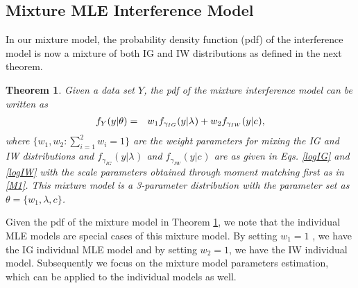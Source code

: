 \documentclass[12pt, draftclsnofoot, onecolumn]{IEEEtran}
\newtheorem{Theorem}{Theorem}
\newtheorem{remark}{Remark}
\theoremstyle{plain}
\begin{document}
\subsection{Mixture MLE Interference Model} \label{MixtureModel}\vspace{-.1in}
In our mixture model, %
the probability density function {\color{black}(pdf)} of the interference model is now a mixture of both IG and IW distributions as defined in the next theorem.\vspace{-.1in}
\begin{Theorem}\label{MixtureTheorem}
Given a data set $Y$, the {\color{black}pdf} of the mixture interference model can be written as  \vspace{-.1in}
\begin{eqnarray}\vspace{-.1in}
f_Y(y|\theta)&=&{w_1 f_{\gamma_{IG}}(y|{{\lambda_{}}})} + {w_2 f_{\gamma_{IW}}(y|{{c_{}}})},
\end{eqnarray}
where $\{w_1, w_2 : \sum_{i=1}^2 w_i=1\}$ are the weight parameters for mixing the IG and IW distributions %
and $f_{\gamma_{IG}}(y|{{\lambda_{}}})$ and $f_{\gamma_{IW}}(y|{{c_{}}})$ are as given in Eqs. \eqref{logIG} and \eqref{logIW} with the scale parameters obtained through moment matching first as in \eqref{M1}. This mixture model is a 3-parameter distribution with the parameter set as $\theta=\{w_1, \lambda, c\}$.%
\end{Theorem}

Given the pdf of the mixture model in Theorem \ref{MixtureTheorem}, we note that the individual MLE models are special cases of this mixture model. By setting $w_1=1$ , we have the IG individual MLE model and by setting $w_2=1$, we have the IW individual model. 
Subsequently we focus on the mixture model parameters 
estimation, which can be applied to the individual models as well. 
\vspace{-.15in}
\end{document}
